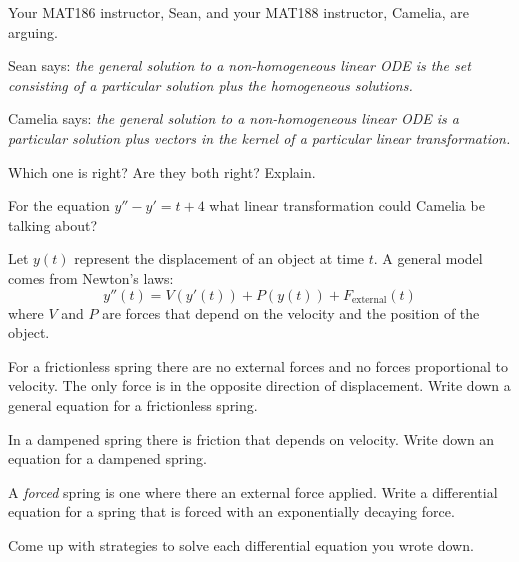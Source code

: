 \documentclass{workbook}
\begin{document}
\begin{slide}
	\question
	Your MAT186 instructor, Sean, and your MAT188 instructor, Camelia, are 
	arguing.

	Sean says: \emph{the general solution to a non-homogeneous linear ODE is 
	the set consisting of a particular solution plus the homogeneous solutions.}

	Camelia says: \emph{the general solution to a non-homogeneous linear ODE
	is a particular solution plus vectors in the kernel of a particular linear transformation.}

	\bigskip

	\begin{parts}
		\item Which one is right? Are they both right? Explain.
		\item For the equation $y''-y'=t+4$ what linear transformation could Camelia be talking about?
	\end{parts}

\end{slide}

\begin{slide}
	\question
	Let $y(t)$ represent the displacement of an object at time $t$.
	A general model comes from Newton's laws:
	\[
		y''(t)= V(y'(t)) + P(y(t)) + F_{\text{external}}(t)
	\]
	where $V$ and $P$ are forces that depend on the velocity and the position of the object.

	\begin{parts}
		\item For a frictionless spring there are no external forces and
		no forces proportional to velocity. The only force is in the opposite direction of displacement. Write down a general equation for a frictionless spring.
		\item In a dampened spring there is friction that depends on velocity. Write down an equation for a dampened spring.
		\item A \emph{forced} spring is one where there an external force applied.  Write a differential equation for a spring that is forced with an exponentially decaying force.
		\item Come up with strategies to solve each differential equation you wrote down.
	\end{parts}

\end{slide}
\end{document}
